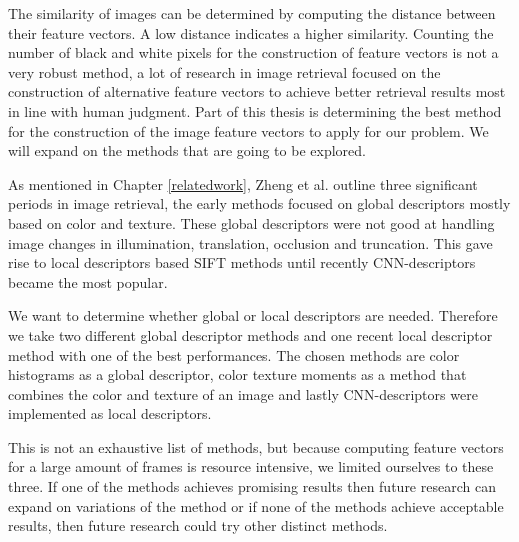 \documentclass{report}
\begin{document}
The similarity of images can be determined by computing the distance between their feature vectors. A low distance indicates a higher similarity. Counting the number of black and white pixels for the construction of feature vectors is not a very robust method, a lot of research in image retrieval focused on the construction of alternative feature vectors to achieve better retrieval results most in line with human judgment. Part of this thesis is determining the best method for the construction of the image feature vectors to apply for our problem. We will expand on the methods that are going to be explored. 

As mentioned in Chapter \ref{relatedwork}, Zheng et al. \cite{zheng2018sift} outline three significant periods in image retrieval, the early methods focused on global descriptors mostly based on color and texture. These global descriptors were not good at handling image changes in illumination, translation, occlusion and truncation. This gave rise to local descriptors based SIFT methods until recently CNN-descriptors became the most popular. 

We want to determine whether global or local descriptors are needed. Therefore we take two different global descriptor methods and one recent local descriptor method with one of the best performances. The chosen methods are color histograms as a global descriptor, color texture moments \cite{yu2002colortexturemoments} as a method that combines the color and texture of an image and lastly CNN-descriptors were implemented as local descriptors.

This is not an exhaustive list of methods, but because computing feature vectors for a large amount of frames is resource intensive, we limited ourselves to these three. If one of the methods achieves promising results then future research can expand on variations of the method or if none of the methods achieve acceptable results, then future research could try other distinct methods.
\end{document}
